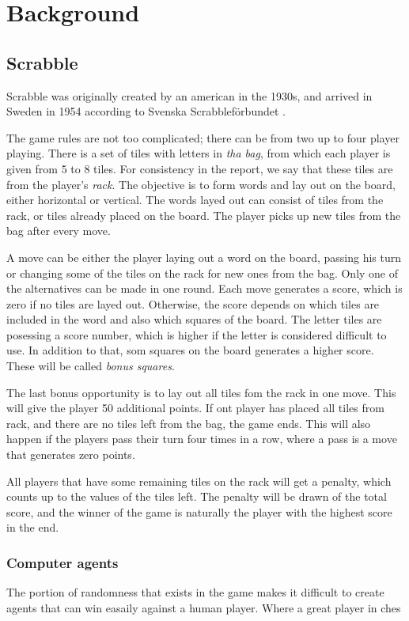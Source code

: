 \documentclass[a4paper, 12pt]{report}
\begin{document}
\chapter{Background}

\section{Scrabble}
Scrabble was originally created by an american in the 1930s, and arrived in Sweden in 1954 according to Svenska Scrabbleförbundet \cite{forbund}. 

The game rules are not too complicated; there can be from two up to four player playing. There is a set of tiles with letters in \emph{tha bag}, from which each player is given from 5 to 8 tiles. For consistency in the report, we say that these tiles are from the player's \emph{rack}. The objective is to form words and lay out on the board, either horizontal or vertical. The words layed out can consist of tiles from the rack, or tiles already placed on the board. The player picks up new tiles from the bag after every move.

A move can be either the player laying out a word on the board, passing his turn or changing some of the tiles on the rack for new ones from the bag. Only one of the alternatives can be made in one round. Each move generates a score, which is zero if no tiles are layed out. Otherwise, the score depends on which tiles are included in the word and also which squares of the board. The letter tiles are posessing a score number, which is higher if the letter is considered difficult to use. In addition to that, som squares on the board generates a higher score. These will be called \emph{bonus squares}. 

The last bonus opportunity is to lay out all tiles fom the rack in one move. This will give the player 50  additional points. If ont player has placed all tiles from rack, and there are no tiles left from the bag, the game ends. This will also happen if the players pass their turn four times in a row, where a pass is a move that generates zero points. 

All players that have some remaining tiles on the rack will get a penalty, which counts up to the values of the tiles left. The penalty will be drawn of the total score, and the winner of the game is naturally the player with the highest score in the end.

\subsection{Computer agents}
The portion of randomness that exists in the game makes it difficult to create agents that can win easaily against a human player. Where a great player in ches
\end{document}
